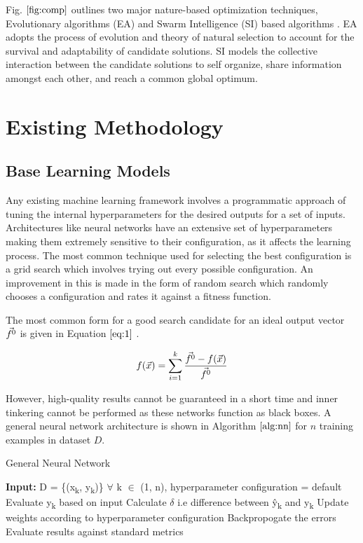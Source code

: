 \documentclass[conference]{IEEEtran}
\begin{document}
Fig. $\ref{fig:comp}$ outlines two major nature-based optimization techniques, Evolutionary algorithms (EA) and Swarm Intelligence (SI) based algorithms \cite{fried}. EA adopts the process of evolution and theory of natural selection to account for the survival and adaptability of candidate solutions. SI models the collective interaction between the candidate solutions to self organize, share information amongst each other, and reach a common global optimum. 


\section{Existing Methodology}

\subsection{Base Learning Models}
Any existing machine learning framework involves a programmatic approach of tuning the internal hyperparameters for the desired outputs for a set of inputs. Architectures like neural networks have an extensive set of hyperparameters making them extremely sensitive to their configuration, as it affects the learning process. The most common technique used for selecting the best configuration is a grid search which involves trying out every possible configuration. An improvement in this is made in the form of random search which randomly chooses a configuration and rates it against a fitness function. 

The most common form for a good search candidate for an ideal output vector $\vec{f\textsuperscript{0}}$ is given in Equation $\ref{eq:1}$ \cite{Osyczka}.

\begin{equation}
\scriptsize
\label{eq:1}
f(\vec{x}) = \sum_{i=1}^{k}\frac{\vec{f\textsuperscript{0}} - f(\vec{x})}{\vec{f\textsuperscript{0}}}
\end{equation}

However, high-quality results cannot be guaranteed in a short time and inner tinkering cannot be performed as these networks function as black boxes. A general neural network architecture is shown in Algorithm $\ref{alg:nn}$ for $\textit{n}$ training examples in dataset $\textit{D}$. 

\vspace{-0.2cm}


\begin{algorithm}[b]
\scriptsize
\caption{General Neural Network}
\label{alg:nn}
\begin{algorithmic}[1]
\STATE \textbf{Input:} D = \{(x\textsubscript{k}, y\textsubscript{k})\} $\forall$ k $\in$ (1, n), hyperparameter configuration = default
\STATE Evaluate y\textsubscript{k} based on input
\STATE Calculate $\delta$ i.e difference between \^y\textsubscript{k} and y\textsubscript{k}
\STATE Update weights according to hyperparameter configuration
\STATE Backpropogate the errors
\STATE Evaluate results against standard metrics
\ENDWHILE
\end{algorithmic}
\end{algorithm}
\end{document}
